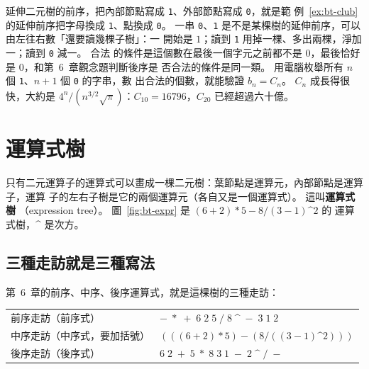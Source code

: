 延伸二元樹的前序，把內部節點寫成 \texttt{1}、外部節點寫成 \texttt{0}，就是範
例~\ref{ex:bt-club} 的延伸前序把字母換成 \texttt{1}、點換成 \texttt{0}。 一串
\texttt{0}、\texttt{1} 是不是某棵樹的延伸前序，可以由左往右數「還要讀幾棵子樹」：一
開始是 $1$；讀到 \texttt{1} 用掉一棵、多出兩棵，淨加一；讀到 \texttt{0} 減一。 合法
的條件是這個數在最後一個字元之前都不是 $0$，最後恰好是 $0$，和第~6~章觀念題判斷後序是
否合法的條件是同一類。 用電腦枚舉所有 $n$ 個 \texttt{1}、$n + 1$ 個 \texttt{0} 的字串，數
出合法的個數，就能驗證 $b_n = C_n$。 $C_n$ 成長得很快，大約是
$4^n / (n^{3/2}\sqrt{\pi})$：$C_{10} = 16796$，$C_{20}$ 已經超過六十億。

\section{運算式樹}
\label{sec:bt-expr}

只有二元運算子的運算式可以畫成一棵二元樹：葉節點是運算元，內部節點是運算子，運算
子的左右子樹是它的兩個運算元（各自又是一個運算式）。 這叫\textbf{運算式樹}
（expression tree）。 圖~\ref{fig:bt-expr} 是 $(6 + 2) * 5 - 8 / (3 - 1) \text{\textasciicircum} 2$ 的
運算式樹，\textasciicircum{} 是次方。

\begin{center}
\label{fig:bt-expr}
\end{center}

\subsection{三種走訪就是三種寫法}

第~6~章的前序、中序、後序運算式，就是這棵樹的三種走訪：

\begin{center}
\begin{tabular}{ll}
\toprule
前序走訪（前序式）& $-\;*\;+\;6\;2\;5\;/\;8\;\text{\textasciicircum}\;-\;3\;1\;2$ \\
中序走訪（中序式，要加括號）& $(((6 + 2) * 5) - (8 / ((3 - 1) \text{\textasciicircum} 2)))$ \\
後序走訪（後序式）& $6\;2\;+\;5\;*\;8\;3\;1\;-\;2\;\text{\textasciicircum}\;/\;-$ \\
\bottomrule
\end{tabular}
\end{center}

